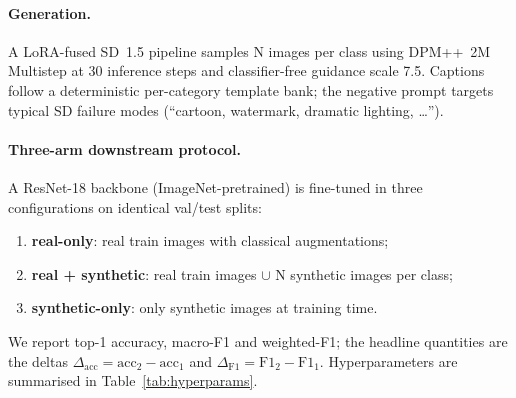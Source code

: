 \documentclass[12pt,a4paper]{article}
\begin{document}
\paragraph{Generation.} A LoRA-fused SD~1.5 pipeline samples N images
per class using DPM++~2M Multistep at 30 inference steps and classifier-free
guidance scale 7.5. Captions follow a deterministic per-category template
bank; the negative prompt targets typical SD failure modes
(``cartoon, watermark, dramatic lighting, \dots'').

\paragraph{Three-arm downstream protocol.} A ResNet-18 backbone
(ImageNet-pretrained) is fine-tuned in three configurations on identical
val/test splits:
\begin{enumerate}
\setlength\itemsep{-0.1em}
\item \textbf{real-only}: real train images with classical augmentations;
\item \textbf{real + synthetic}: real train images $\cup$ N synthetic images per class;
\item \textbf{synthetic-only}: only synthetic images at training time.
\end{enumerate}
We report top-1 accuracy, macro-F1 and weighted-F1; the headline
quantities are the deltas $\Delta_\text{acc} = \mathrm{acc}_2 -
\mathrm{acc}_1$ and $\Delta_{\text{F1}} = \mathrm{F1}_2 -
\mathrm{F1}_1$. Hyperparameters are summarised in
Table~\ref{tab:hyperparams}.
\end{document}
